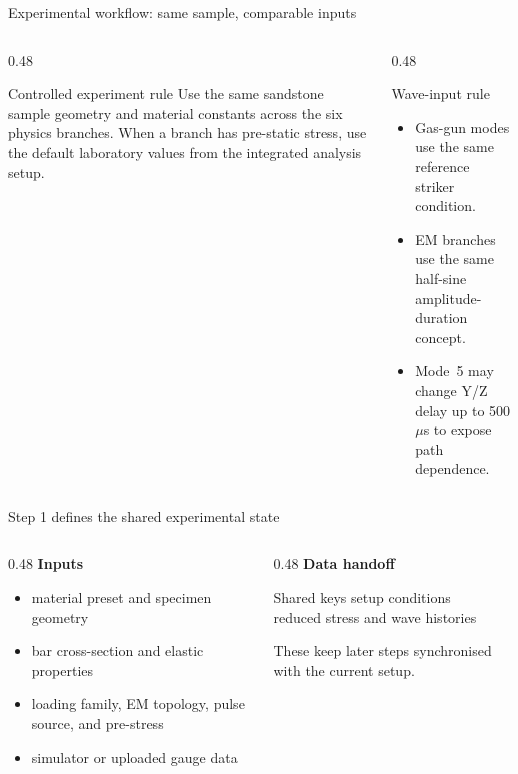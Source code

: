 \documentclass[11pt,aspectratio=169]{beamer}
\begin{document}
\begin{frame}{Experimental workflow: same sample, comparable inputs}
  \begin{columns}[T,onlytextwidth]
    \begin{column}{0.48\textwidth}
      \begin{block}{Controlled experiment rule}
        Use the same sandstone sample geometry and material constants across
        the six physics branches. When a branch has pre-static stress, use the
        default laboratory values from the integrated analysis setup.
      \end{block}
    \end{column}
    \begin{column}{0.48\textwidth}
      \begin{exampleblock}{Wave-input rule}
        \begin{itemize}
          \item Gas-gun modes use the same reference striker condition.
          \item EM branches use the same half-sine amplitude-duration concept.
          \item Mode~5 may change Y/Z delay up to 500 $\mu$s to expose path dependence.
        \end{itemize}
      \end{exampleblock}
    \end{column}
  \end{columns}
\end{frame}

\begin{frame}{Step 1 defines the shared experimental state}
  \begin{columns}[T,onlytextwidth]
    \begin{column}{0.48\textwidth}
      \textbf{Inputs}
      \begin{itemize}
        \item material preset and specimen geometry
        \item bar cross-section and elastic properties
        \item loading family, EM topology, pulse source, and pre-stress
        \item simulator or uploaded gauge data
      \end{itemize}
    \end{column}
    \begin{column}{0.48\textwidth}
      \textbf{Data handoff}
      \begin{block}{Shared keys}
        setup conditions\\
        reduced stress and wave histories
      \end{block}
      These keep later steps synchronised with the current setup.
    \end{column}
  \end{columns}
\end{frame}
\end{document}
